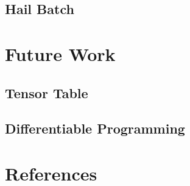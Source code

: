 \documentclass[10pt]{article}
\begin{document}
\subsection{Hail Batch}

\section{Future Work}
\subsection{Tensor Table}
\subsection{Differentiable Programming}
\cite{dremel}
\cite{numpywren}
\cite{rdd}
\cite{towards-scalable-dataframe-systems}

\section{References}
\printbibliography
\end{document}
